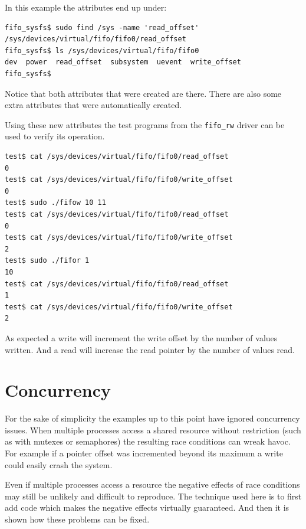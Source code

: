 \documentclass{article}
\begin{document}
In this example the attributes end up under:

\begin{verbatim}
fifo_sysfs$ sudo find /sys -name 'read_offset'
/sys/devices/virtual/fifo/fifo0/read_offset
fifo_sysfs$ ls /sys/devices/virtual/fifo/fifo0
dev  power  read_offset  subsystem  uevent  write_offset
fifo_sysfs$ 
\end{verbatim}

Notice that both attributes that were created are there.
There are also some extra attributes that were automatically
created.

\begin{samepage}
Using these new attributes the test programs from the \verb+fifo_rw+
driver can be used to verify its operation.

\begin{verbatim}
test$ cat /sys/devices/virtual/fifo/fifo0/read_offset 
0
test$ cat /sys/devices/virtual/fifo/fifo0/write_offset 
0
test$ sudo ./fifow 10 11
test$ cat /sys/devices/virtual/fifo/fifo0/read_offset 
0
test$ cat /sys/devices/virtual/fifo/fifo0/write_offset 
2
test$ sudo ./fifor 1
10
test$ cat /sys/devices/virtual/fifo/fifo0/read_offset 
1
test$ cat /sys/devices/virtual/fifo/fifo0/write_offset 
2
\end{verbatim}
\end{samepage}

As expected a write will increment the write offset by
the number of values written.
And a read will increase the read pointer by the number
of values read.


\clearpage
\section{Concurrency}

For the sake of simplicity the examples up to this point have
ignored concurrency issues.
When multiple processes access a shared resource without restriction
(such as with mutexes or semaphores) the resulting race conditions
can wreak havoc.
For example if a pointer offset was incremented beyond its maximum
a write could easily crash the system.

Even if multiple processes access a resource the negative effects of
race conditions may still be unlikely and difficult to reproduce.
The technique used here is to first add code which makes the negative
effects virtually guaranteed.
And then it is shown how these problems can be fixed.
\end{document}
